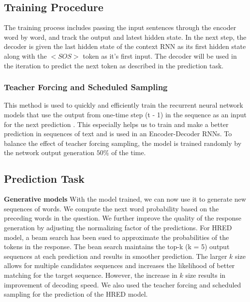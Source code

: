 \subsection{Training Procedure}
The training process includes passing the input sentences through the encoder word by word, and track the output and latest hidden state. In the next step, the decoder is given the last hidden state of the context RNN as its first hidden state along with the $<SOS>$ token as it's first input. The decoder will be used in the iteration to predict the next token as described in the prediction task.

\subsubsection{Teacher Forcing and Scheduled Sampling}
This method is used to quickly and efficiently train the recurrent neural network models that use the output from one-time step (t - 1) in the sequence as an input for the next prediction \cite{DBLP:journals/corr/BengioVJS15}. This especially helps us to train and make a better prediction in sequences of text and is used in an Encoder-Decoder RNNs. To balance the effect of teacher forcing sampling, the model is trained randomly by the network output generation $50\%$ of the time. 


\subsection{Prediction Task}
\textbf{Generative models} With the model trained, we can now use it to generate new sequences of words. We compute the next word probability based on the preceding words in the question. We further improve the quality of the response generation by adjusting the normalizing factor of the predictions.  For HRED model, a beam search has been sued to approximate the probabilities of the tokens in the response. The bean search maintains the top-k (k = 5) output sequences at each prediction and results in smoother prediction. The larger $k$ size allows for multiple candidates sequences and increases the likelihood of better matching for the target sequence. However, the increase in $k$ size results in improvement of decoding speed. We also used the teacher forcing and scheduled sampling for the prediction of the HRED model. 
\vspace{-0.75em}


